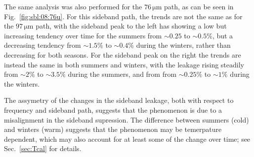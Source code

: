 The same analysis was also performed for the $76\,\mathrm{\mu m}$ path, as can
be seen in Fig.~\ref{fig:sbl:08:76u}.  For this sideband path, the trends are
not the same as for the $97\,\mathrm{\mu m}$ path, with the sideband peak to
the left has showing a low but increasing tendency over time for the summers
from $\sim0.25$ to $\sim0.5\%$, but a decreasing tendency from $\sim1.5\%$ to
$\sim0.4\%$ during the winters, rather than decreasing
for both seasons. For the sideband peak on the right the trends are instead the
same in both summers and winters, with the leakage
rising steadily from $\sim2\%$ to $\sim3.5\%$ during the summers, and from
from $\sim0.25\%$ to $\sim1\%$ during the winters.

The assymetry of the changes in the sideband leakage, both with respect to
frequency and sideband path, suggests that the phenomenon is due to a
misalignment in the sideband supression.  The difference between summers (cold)
and winters (warm) suggests that the phenomenon may be temerpature dependent,
which may also account for at least some of the change over time; see
Sec.~\ref{sec:Tcal} for details.
